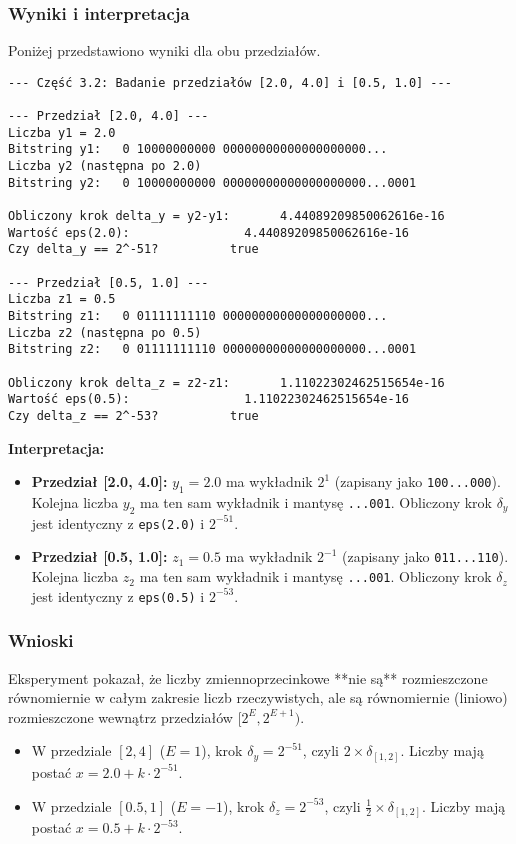 \documentclass[11pt, a4paper]{article}
\begin{document}
\subsubsection{Wyniki i interpretacja}
Poniżej przedstawiono wyniki dla obu przedziałów.
\begin{verbatim}
--- Część 3.2: Badanie przedziałów [2.0, 4.0] i [0.5, 1.0] ---

--- Przedział [2.0, 4.0] ---
Liczba y1 = 2.0
Bitstring y1:   0 10000000000 00000000000000000000...
Liczba y2 (następna po 2.0)
Bitstring y2:   0 10000000000 00000000000000000000...0001

Obliczony krok delta_y = y2-y1:       4.44089209850062616e-16
Wartość eps(2.0):                4.44089209850062616e-16
Czy delta_y == 2^-51?          true

--- Przedział [0.5, 1.0] ---
Liczba z1 = 0.5
Bitstring z1:   0 01111111110 00000000000000000000...
Liczba z2 (następna po 0.5)
Bitstring z2:   0 01111111110 00000000000000000000...0001

Obliczony krok delta_z = z2-z1:       1.11022302462515654e-16
Wartość eps(0.5):                1.11022302462515654e-16
Czy delta_z == 2^-53?          true
\end{verbatim}

\noindent \textbf{Interpretacja:}
\begin{itemize}
    \item \textbf{Przedział [2.0, 4.0]:} $y_1 = 2.0$ ma wykładnik $2^1$ (zapisany jako \texttt{100...000}). Kolejna liczba $y_2$ ma ten sam wykładnik i mantysę \texttt{...001}. Obliczony krok $\delta_y$ jest identyczny z \texttt{eps(2.0)} i $2^{-51}$.
    \item \textbf{Przedział [0.5, 1.0]:} $z_1 = 0.5$ ma wykładnik $2^{-1}$ (zapisany jako \texttt{011...110}). Kolejna liczba $z_2$ ma ten sam wykładnik i mantysę \texttt{...001}. Obliczony krok $\delta_z$ jest identyczny z \texttt{eps(0.5)} i $2^{-53}$.
\end{itemize}

\subsubsection{Wnioski}
Eksperyment pokazał, że liczby zmiennoprzecinkowe **nie są** rozmieszczone równomiernie w całym zakresie liczb rzeczywistych, ale są równomiernie (liniowo) rozmieszczone wewnątrz przedziałów $[2^E, 2^{E+1})$.

\begin{itemize}
    \item W przedziale $[2, 4]$ ($E=1$), krok $\delta_y = 2^{-51}$, czyli $2 \times \delta_{[1,2]}$. Liczby mają postać $x = 2.0 + k \cdot 2^{-51}$.
    \item W przedziale $[0.5, 1]$ ($E=-1$), krok $\delta_z = 2^{-53}$, czyli $\frac{1}{2} \times \delta_{[1,2]}$. Liczby mają postać $x = 0.5 + k \cdot 2^{-53}$.
\end{itemize}
\end{document}
